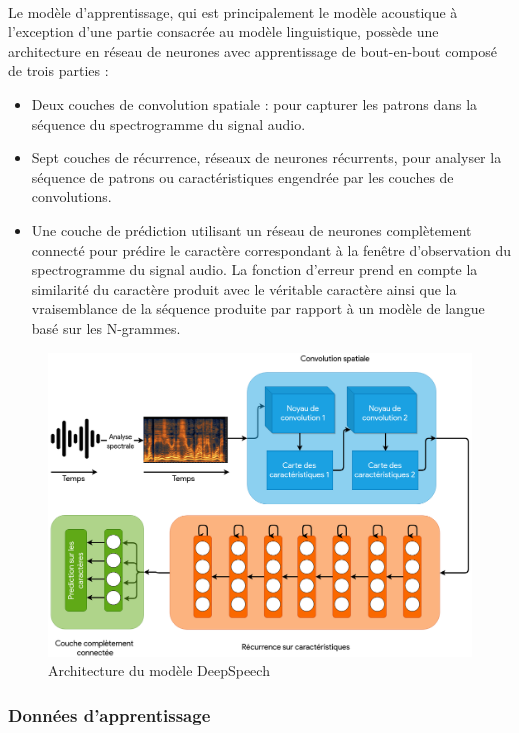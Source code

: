 		\paragraph{}
		Le modèle d'apprentissage, qui est principalement le modèle acoustique à l'exception d'une partie consacrée au modèle linguistique, possède une architecture en réseau de neurones avec apprentissage de bout-en-bout composé de trois parties : 
		\begin{itemize}
			\item Deux couches de convolution spatiale : pour capturer les patrons dans la séquence du spectrogramme du signal audio.
			\item Sept couches de récurrence, réseaux de neurones récurrents, pour analyser la séquence de patrons ou caractéristiques engendrée par les couches de convolutions. 
			\item Une couche de prédiction utilisant un réseau de neurones complètement connecté pour prédire le caractère correspondant à la fenêtre d'observation du spectrogramme du signal audio. La fonction d'erreur prend en compte la similarité du caractère produit avec le véritable caractère ainsi que la vraisemblance de la séquence produite par rapport à un modèle de langue basé sur les N-grammes.
		\end{itemize}
		\begin{figure}[h] 
			\centering
			\includegraphics[width=0.88\linewidth]{images/Conception/ASR/deeps_speech_arch.png}
			\caption{Architecture du modèle DeepSpeech \citep{deepspeech_paper}}
			\label{fig:deepSpeechArch}
			
		\end{figure}
		\subsubsection*{Données d'apprentissage}
		\label{common_voice}
